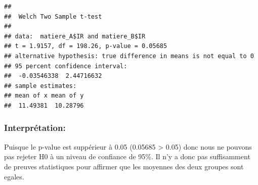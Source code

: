 \documentclass[
]{article}
\newenvironment{Shaded}{\begin{snugshade}}{\end{snugshade}}
\newcommand{\CommentTok}[1]{\textcolor[rgb]{0.56,0.35,0.01}{\textit{#1}}}
\newcommand{\DecValTok}[1]{\textcolor[rgb]{0.00,0.00,0.81}{#1}}
\newcommand{\FunctionTok}[1]{\textcolor[rgb]{0.13,0.29,0.53}{\textbf{#1}}}
\newcommand{\NormalTok}[1]{#1}
\newcommand{\OtherTok}[1]{\textcolor[rgb]{0.56,0.35,0.01}{#1}}
\newcommand{\SpecialCharTok}[1]{\textcolor[rgb]{0.81,0.36,0.00}{\textbf{#1}}}
\newcommand{\StringTok}[1]{\textcolor[rgb]{0.31,0.60,0.02}{#1}}
\begin{document}
\begin{Shaded}
\end{Shaded}

\begin{verbatim}
## 
##  Welch Two Sample t-test
## 
## data:  matiere_A$IR and matiere_B$IR
## t = 1.9157, df = 198.26, p-value = 0.05685
## alternative hypothesis: true difference in means is not equal to 0
## 95 percent confidence interval:
##  -0.03546338  2.44716632
## sample estimates:
## mean of x mean of y 
##  11.49381  10.28796
\end{verbatim}

\hypertarget{interpruxe9tation}{%
\subsubsection{Interprétation:}\label{interpruxe9tation}}

Puisque le p-value est suppérieur à 0.05 (0.05685 \textgreater{} 0.05)
donc nous ne pouvons pas rejeter H0 à un niveau de confiance de 95\%. Il
n'y a donc pas suffisamment de preuves statistiques pour affirmer que
les moyennes des deux groupes sont egales.
\end{document}
